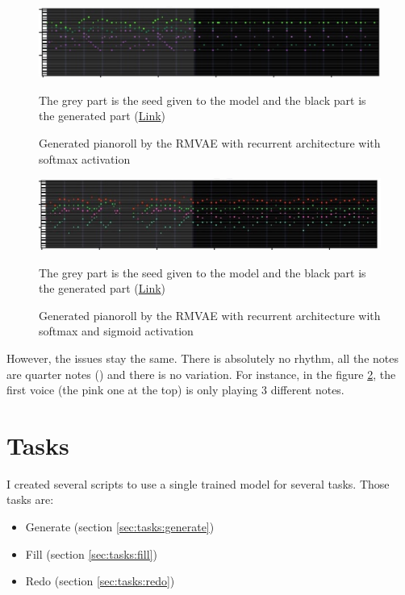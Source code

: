 \documentclass[12pt]{report}
\begin{document}
\begin{figure}[htbp]
    \centering
    \includegraphics[width=\textwidth]{images/generated_midis/RRMVAE/pianoroll-rrmvae-no-binary.jpg}
    \caption{Generated pianoroll by the RMVAE with recurrent architecture with softmax activation}
    The grey part is the seed given to the model and the black part is the generated part
    (\href{https://github.com/ValentinVignal/midiGenerator/blob/master/samples/results/lstm_encoder_decoder.mid}{Link})
    \label{fig:pianoroll:rrmvae:no-binary}
\end{figure}

\begin{figure}[htbp]
    \centering
    \includegraphics[width=\textwidth]{images/generated_midis/RRMVAE/pianoroll-rrmvae-with-binary.jpg}
    \caption{Generated pianoroll by the RMVAE with recurrent architecture with softmax and sigmoid activation}
    The grey part is the seed given to the model and the black part is the generated part
    (\href{https://github.com/ValentinVignal/midiGenerator/blob/master/samples/results/rrmvae-with-binary.mid}{Link})
    \label{fig:pianoroll:rrmvae:with-binary}
\end{figure}

However, the issues stay the same.
There is absolutely no rhythm, all the notes are quarter notes (\musQuarter) and there is no variation.
For instance, in the figure \ref{fig:pianoroll:rrmvae:with-binary}, the first voice (the pink one at the top) is only playing 3 different notes.

\section{Tasks}
\label{sec:tasks}

I created several scripts to use a single trained model for several tasks.
Those tasks are:
\begin{itemize}
    \item Generate (section \ref{sec:tasks:generate})
    \item Fill (section \ref{sec:tasks:fill})
    \item Redo (section \ref{sec:tasks:redo})
\end{itemize}
\end{document}
